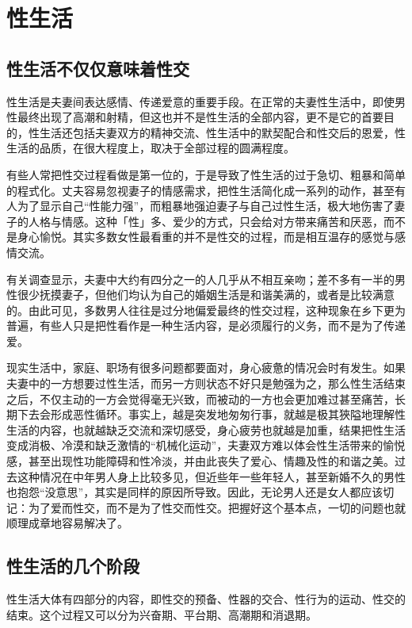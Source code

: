 \documentclass[12pt,UTF8]{ctexbook}
\begin{document}
\part{性生活}

\chapter{性生活不仅仅意味着性交}

性生活是夫妻间表达感情、传递爱意的重要手段。在正常的夫妻性生活中，即使男性最终出现了高潮和射精，但这也并不是性生活的全部内容，更不是它的首要目的，性生活还包括夫妻双方的精神交流、性生活中的默契配合和性交后的恩爱，性生活的品质，在很大程度上，取决于全部过程的圆满程度。

有些人常把性交过程看做是第一位的，于是导致了性生活的过于急切、粗暴和简单的程式化。丈夫容易忽视妻子的情感需求，把性生活简化成一系列的动作，甚至有人为了显示自己“性能力强”，而粗暴地强迫妻子与自己过性生活，极大地伤害了妻子的人格与情感。这种「性」多、爱少的方式，只会给对方带来痛苦和厌恶，而不是身心愉悦。其实多数女性最看重的并不是性交的过程，而是相互温存的感觉与感情交流。

有关调查显示，夫妻中大约有四分之一的人几乎从不相互亲吻；差不多有一半的男性很少抚摸妻子，但他们均认为自己的婚姻生活是和谐美满的，或者是比较满意的。由此可见，多数男人往往是过分地偏爱最终的性交过程，这种现象在乡下更为普遍，有些人只是把性看作是一种生活内容，是必须履行的义务，而不是为了传递爱。

现实生活中，家庭、职场有很多问题都要面对，身心疲惫的情况会时有发生。如果夫妻中的一方想要过性生活，而另一方则状态不好只是勉强为之，那么性生活结束之后，不仅主动的一方会觉得毫无兴致，而被动的一方也会更加难过甚至痛苦，长期下去会形成恶性循环。事实上，越是突发地匆匆行事，就越是极其狹隘地理解性生活的内容，也就越缺乏交流和深切感受，身心疲劳也就越是加重，结果把性生活变成消极、冷漠和缺乏激情的“机械化运动”，夫妻双方难以体会性生活带来的愉悦感，甚至出现性功能障碍和性冷淡，并由此丧失了爱心、情趣及性的和谐之美。过去这种情况在中年男人身上比较多见，但近些年一些年轻人，甚至新婚不久的男性也抱怨“没意思”，其实是同样的原因所导致。因此，无论男人还是女人都应该切记：为了爱而性交，而不是为了性交而性交。把握好这个基本点，一切的问题也就顺理成章地容易解决了。

\chapter{性生活的几个阶段}

性生活大体有四部分的内容，即性交的预备、性器的交合、性行为的运动、性交的结束。这个过程又可以分为兴奋期、平台期、高潮期和消退期。
\end{document}
